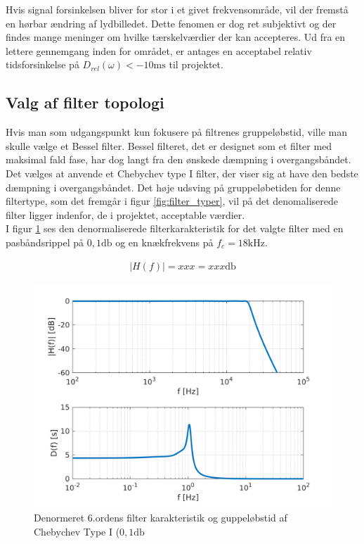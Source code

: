 Hvis signal forsinkelsen bliver for stor i et givet frekvensområde, vil der fremstå en hørbar ændring af lydbilledet.
Dette fenomen er dog ret subjektivt og der findes mange meninger om hvilke tærskelværdier der kan accepteres.
Ud fra en lettere gennemgang inden for området, er antages en acceptabel relativ tidsforsinkelse på $D_{rel}(\omega) < -10 \si{\milli\second}$ til projektet.   

\subsection{Valg af filter topologi}
Hvis man som udgangspunkt kun fokusere på filtrenes gruppeløbstid, ville man skulle vælge et Bessel filter.
Bessel filteret, det er designet som et filter med maksimal fald fase, har dog langt fra den ønskede dæmpning i overgangsbåndet.
Det vælges at anvende et Chebychev type I filter, der viser sig at have den bedste dæmpning i overgangsbåndet.
Det høje udsving på gruppeløbetiden for denne filtertype, som det fremgår i figur \ref{fig:filter_typer}, vil på det denomaliserede filter ligger indenfor, de i projektet, acceptable værdier. 
\\
I figur \ref{fig:filter_cheb1_denorm} ses den denormaliserede filterkarakteristik for det valgte filter med en pasbåndsrippel på $0,1 \si{\decibel}$ og en knækfrekvens på $f_c = 18 \si{\kilo\hertz}$. 

\begin{align}
	|H(f)| = xxx = xxx \si{\decibel}
\end{align}

\begin{figure}[h!]
	\centering
	\includegraphics[width=1\textwidth]{matlab/filter_cheb1_denorm.png}
	\caption{Denormeret 6.ordens filter karakteristik og guppeløbstid af Chebychev Type I ($0,1 \si{\decibel}$}
	\label{fig:filter_cheb1_denorm}
\end{figure}

